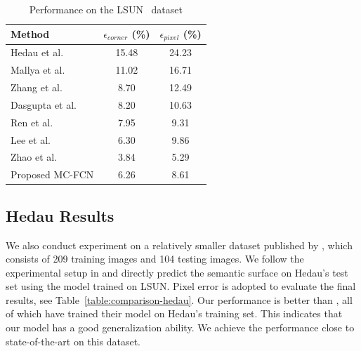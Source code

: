\begin{table}
	\centering 
	\begin{tabular}{lcc}
		\toprule
		Method & $\epsilon_{corner}$ (\%) & $\epsilon_{pixel}$ (\%) \\
		\midrule
		Hedau et al.~\cite{hedau2009recovering} & 15.48 & 24.23 \\
		Mallya et al.~\cite{mallya2015learning} & 11.02 & 16.71 \\
		Zhang et al.~\cite{zhang2017learning} & 8.70 & 12.49 \\
		Dasgupta et al.~\cite{dasgupta2016delay} & 8.20 & 10.63 \\
		Ren et al.~\cite{ren2016coarse} & 7.95 & 9.31 \\
		Lee et al.~\cite{LeeRoomNet17} & 6.30 & 9.86 \\
		Zhao et al.~\cite{zhao2017physics} & 3.84 & 5.29 \\
		\midrule
		Proposed MC-FCN & 6.26 & 8.61 \\
		\bottomrule
	\end{tabular}
	\caption{Performance on the LSUN~\cite{zhang2015large} dataset}	
	\label{table:comparison-lsun}
\end{table}

\subsection{Hedau Results}
\label{sec:Hedau}
We also conduct experiment on a relatively smaller dataset published by \cite{hedau2009recovering}, which consists of 209 training images and 104 testing images. We follow the experimental setup in \cite{LeeRoomNet17} and directly predict the semantic surface on Hedau's test set using the model trained on LSUN. Pixel error is adopted to evaluate the final results, see Table~\ref{table:comparison-hedau}. Our performance is better than \cite{mallya2015learning,zhang2017learning,ren2016coarse}, all of which have trained their model on Hedau's training set. This indicates that our model has a good generalization ability. We achieve the performance close to state-of-the-art on this dataset.

